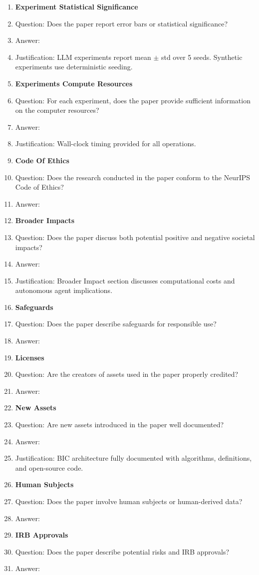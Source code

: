 \documentclass{article}
\begin{document}
\begin{enumerate}
\item {\bf Experiment Statistical Significance}
\item[] Question: Does the paper report error bars or statistical significance?
\item[] Answer: \answerYes{}
\item[] Justification: LLM experiments report mean $\pm$ std over 5 seeds. Synthetic experiments use deterministic seeding.

\item {\bf Experiments Compute Resources}
\item[] Question: For each experiment, does the paper provide sufficient information on the computer resources?
\item[] Answer: \answerYes{}
\item[] Justification: Wall-clock timing provided for all operations.

\item {\bf Code Of Ethics}
\item[] Question: Does the research conducted in the paper conform to the NeurIPS Code of Ethics?
\item[] Answer: \answerYes{}

\item {\bf Broader Impacts}
\item[] Question: Does the paper discuss both potential positive and negative societal impacts?
\item[] Answer: \answerYes{}
\item[] Justification: Broader Impact section discusses computational costs and autonomous agent implications.

\item {\bf Safeguards}
\item[] Question: Does the paper describe safeguards for responsible use?
\item[] Answer: \answerNA{}

\item {\bf Licenses}
\item[] Question: Are the creators of assets used in the paper properly credited?
\item[] Answer: \answerYes{}

\item {\bf New Assets}
\item[] Question: Are new assets introduced in the paper well documented?
\item[] Answer: \answerYes{}
\item[] Justification: BIC architecture fully documented with algorithms, definitions, and open-source code.

\item {\bf Human Subjects}
\item[] Question: Does the paper involve human subjects or human-derived data?
\item[] Answer: \answerNo{}

\item {\bf IRB Approvals}
\item[] Question: Does the paper describe potential risks and IRB approvals?
\item[] Answer: \answerNA{}
\end{enumerate}
\end{document}

